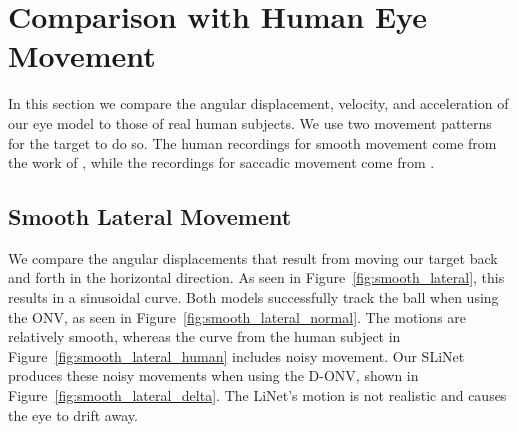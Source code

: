 \documentclass [MS] {UCLAthesis}
\begin{document}
\section{Comparison with Human Eye Movement}

In this section we compare the angular displacement, velocity, and acceleration of our eye model to those of real human subjects. We use two movement patterns for the target to do so. The human recordings for smooth movement come from the work of \citet{human_smooth_lateral}, while the recordings for saccadic movement come from \citet{human_eye}.

\subsection{Smooth Lateral Movement}

We compare the angular displacements that result from moving our target back and forth in the horizontal direction. As seen in Figure~\ref{fig:smooth_lateral}, this results in a sinusoidal curve. Both models successfully track the ball when using the ONV, as seen in Figure~\ref{fig:smooth_lateral_normal}. The motions are relatively smooth, whereas the curve from the human subject in Figure~\ref{fig:smooth_lateral_human} includes noisy movement. Our SLiNet produces these noisy movements when using the D-ONV, shown in Figure~\ref{fig:smooth_lateral_delta}. The LiNet's motion is not realistic and causes the eye to drift away.
\end{document}
